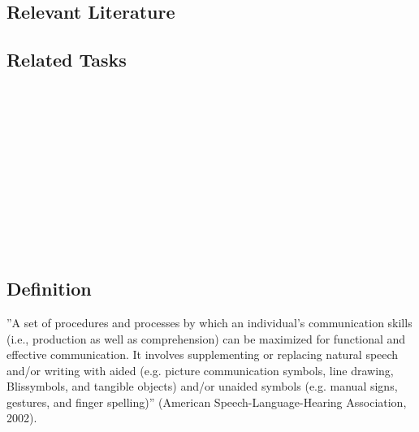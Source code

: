 \subsection{Relevant Literature}
\begin{refsection}
\nocite{test,alang2017police,clayton2018black}
\printbibliography[heading=none]
\end{refsection}
%
\subsection{Related Tasks}
\fourdTwo{}\\\
\fourdThree{}\\
\fourdFour{}\\
\fourdFive{}\\
\fourdTen{}\\
\fourdEleven{}\\
\fourdTwentyOne{}\\
\foureOne{}\\
\fouriThree{}\\
\fouriFour{}\\
%
%
%
%
%
%
%
%
\section{\fourfEight{}}
\subsection{Definition}
''A set of procedures and processes by which an individual's communication skills (i.e., production as well as comprehension) can be maximized for functional and effective communication. It involves supplementing or replacing natural speech and/or writing with aided (e.g. picture communication symbols, line drawing, Blissymbols, and tangible objects) and/or unaided symbols (e.g. manual signs, gestures, and finger spelling)'' (American Speech-Language-Hearing Association, 2002).

